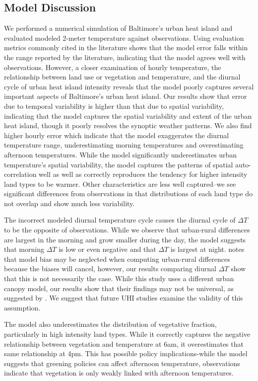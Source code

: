 \documentclass[draft,linenumbers]{agujournal}
\begin{document}
 
\subsection{Model Discussion}
We performed a numerical simulation of Baltimore's urban heat island and evaluated modeled 2-meter temperature against observations. 
Using evaluation metrics commonly cited in the literature shows that the model error falls within the range reported by the literature, indicating that the model agrees well with observations. 
However, a closer examination of hourly temperature, the relationship between land use or vegetation and temperature, and the diurnal cycle of urban heat island intensity reveals that the model poorly captures several important aspects of Baltimore's urban heat island. 
Our results show that error due to temporal variability is higher than that due to spatial variability, indicating that the model captures the spatial variability and extent of the urban heat island, though it poorly resolves the synoptic weather patterns. We also find higher hourly error which indicate that the model exaggerates the diurnal temperature range, underestimating morning temperatures and overestimating afternoon temperatures. 
While the model significantly underestimates urban temperature's spatial variability, the model captures the patterns of spatial auto-correlation well as well as correctly reproduces the tendency for higher intensity land types to be warmer. Other characteristics are less well captured--we see significant differences from observations in that distributions of each land type do not overlap and show much less variability. 

 The incorrect modeled diurnal temperature cycle causes the diurnal cycle of $\Delta T$ to be the opposite of observations. While we observe that urban-rural differences are largest in the morning and grow smaller during the day, the model suggests that morning $\Delta T$ is low or even negative and that $\Delta T$ is largest at night. \cite{lisynergistic2003} notes that model bias may be neglected when computing urban-rural differences because the biases will cancel, however, our results comparing diurnal $\Delta T$  show that this is not necessarily the case. While this study uses a different urban canopy model, our results show that their findings may not be universal, as suggested by \cite{scott2018reduced}.  We suggest that future UHI studies examine the validity of this assumption. 

The model also underestimates the distribution of vegetative fraction, particularly in high intensity land types. While it correctly captures the negative relationship between vegetation and temperature at 6am, it overestimates that same relationship at 4pm. This has possible policy implications-while the model suggests that greening policies can affect afternoon temperature, observations indicate that vegetation is only weakly linked with afternoon temperatures.
% 
\end{document}
